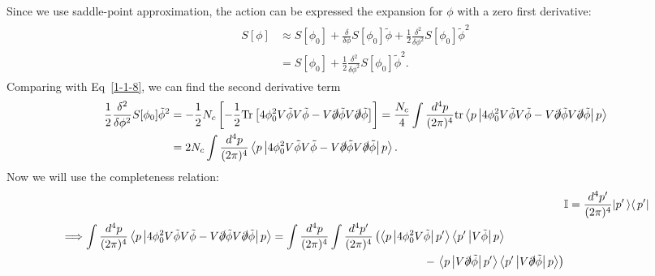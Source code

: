 \documentclass[tightenlines,floatfix,nofootinbib,superscriptaddress,fleqn]{revtex4-2}
\begin{document}
Since we use saddle-point approximation, the action can be expressed the expansion for $\phi$
with a zero first derivative:
\begin{align}\label{1-1-9}
  \begin{split}
    S[\phi] &\approx S[\phi_0]+\frac{\delta}{\delta\phi}S[\phi_0]\tilde{\phi}
    +\frac{1}{2}\frac{\delta^2}{\delta\phi^2}S[\phi_0]\tilde{\phi}^2\\
    &=S[\phi_0]+\frac{1}{2}\frac{\delta^2}{\delta\phi^2}S[\phi_0]\tilde{\phi}^2.
  \end{split}
\end{align}
Comparing with Eq~\eqref{1-1-8}, we can find the second derivative term
\begin{align}\label{1-1-10}
  \begin{split}
    \frac{1}{2}\frac{\delta^2}{\delta\phi^2}S[\phi_0]\tilde{\phi}^2
    &=-\frac{1}{2}N_c\left[
      -\frac{1}{2}\mathrm{Tr}\left[
      4\phi_0^2V\tilde{\phi}V\tilde{\phi}
      -V\slashed{\partial}\tilde{\phi}
       V\slashed{\partial}\tilde{\phi}
      \right]
    \right]=\frac{N_c}{4}\int\frac{d^4p}{(2\pi)^4}
    \mathrm{tr}\left<p\left|4\phi_0^2V\tilde{\phi}V\tilde{\phi}
    -V\slashed{\partial}\tilde{\phi}
     V\slashed{\partial}\tilde{\phi}\right|p\right> \\
     &=2N_c\int\frac{d^4p}{(2\pi)^4}
     \left<p\left|4\phi_0^2V\tilde{\phi}V\tilde{\phi}
     -V\slashed{\partial}\tilde{\phi}
      V\slashed{\partial}\tilde{\phi}\right|p\right>.
  \end{split}
\end{align}
Now we will use the completeness relation:
\begin{align}\label{1-1-11}
  &\mathbb{I} = \frac{d^4p'}{(2\pi)^4}|p'\left>\right<p'|\\
  \begin{split}
    &\Longrightarrow
    \int\frac{d^4p}{(2\pi)^4}
     \left<p\left|4\phi_0^2V\tilde{\phi}V\tilde{\phi}
     -V\slashed{\partial}\tilde{\phi}
      V\slashed{\partial}\tilde{\phi}\right|p\right>
      =\int\frac{d^4p}{(2\pi)^4}\int\frac{d^4p'}{(2\pi)^4}
      \left(
                \left<p
                \left|4\phi_0^2V\tilde{\phi}
                \right|p'
                \right>
              \left<p'
              \left|V\tilde{\phi}
              \right|
              p\right>
      \right.\\
      &\qquad\qquad\qquad\qquad\qquad\qquad\qquad\qquad\qquad
      \qquad\qquad\qquad\qquad\qquad\qquad\qquad
      -\left.
                      \left<p
                      \left|V\slashed{\partial}\tilde{\phi}
                      \right|p'
                      \right>
              \left<p'
              \left|V\slashed{\partial}\tilde{\phi}
              \right|p
              \right>
        \right)
  \end{split}
\end{align}
\end{document}
